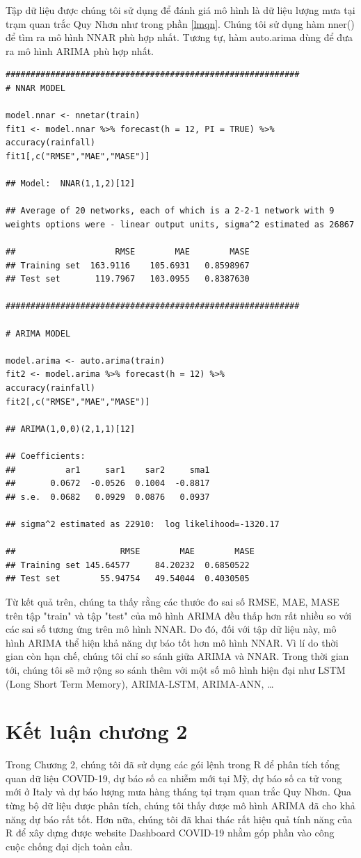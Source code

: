 \documentclass[12pt, a4paper,oneside]{book}
\theoremstyle{definition}
\begin{document}
Tập dữ liệu được chúng tôi sử dụng để đánh giá mô hình là dữ liệu lượng mưa tại trạm quan trắc Quy Nhơn như trong phần \ref{lmqn}. Chúng tôi sử dụng hàm nner() để tìm ra mô hình NNAR phù hợp nhất. Tương tự, hàm auto.arima dùng để đưa ra mô hình ARIMA phù hợp nhất.\\
\begin{lstlisting}
###########################################################
# NNAR MODEL

model.nnar <- nnetar(train)
fit1 <- model.nnar %>% forecast(h = 12, PI = TRUE) %>%
accuracy(rainfall)
fit1[,c("RMSE","MAE","MASE")]

## Model:  NNAR(1,1,2)[12] 

## Average of 20 networks, each of which is a 2-2-1 network with 9 weights options were - linear output units, sigma^2 estimated as 26867

##                    RMSE        MAE        MASE
## Training set  163.9116    105.6931   0.8598967
## Test set       119.7967   103.0955   0.8387630   

###########################################################

# ARIMA MODEL

model.arima <- auto.arima(train)
fit2 <- model.arima %>% forecast(h = 12) %>%
accuracy(rainfall)
fit2[,c("RMSE","MAE","MASE")]

## ARIMA(1,0,0)(2,1,1)[12] 

## Coefficients:
##          ar1     sar1    sar2     sma1
##       0.0672  -0.0526  0.1004  -0.8817
## s.e.  0.0682   0.0929  0.0876   0.0937

## sigma^2 estimated as 22910:  log likelihood=-1320.17

##                     RMSE        MAE        MASE
## Training set 145.64577     84.20232  0.6850522
## Test set        55.94754   49.54044  0.4030505   
\end{lstlisting}
Từ kết quả trên, chúng ta thấy rằng các thước đo sai số RMSE, MAE, MASE trên tập "train" và tập "test" của mô hình ARIMA đều thấp hơn rất nhiều so với các sai số tương ứng trên mô hình NNAR. Do đó, đối với tập dữ liệu này, mô hình ARIMA thể hiện khả năng dự báo tốt hơn mô hình NNAR. Vì lí do thời gian còn hạn chế, chúng tôi chỉ so sánh giữa ARIMA và NNAR. Trong thời gian tới, chúng tôi sẽ mở rộng so sánh thêm với một số mô hình hiện đại như LSTM (Long Short Term Memory), ARIMA-LSTM, ARIMA-ANN, \dots
\section*{Kết luận chương 2}
Trong Chương 2, chúng tôi đã sử dụng các gói lệnh trong R để phân tích tổng quan dữ liệu COVID-19, dự báo số ca nhiễm mới tại Mỹ, dự báo số ca tử vong mới ở Italy và dự báo lượng mưa hàng tháng tại trạm quan trắc Quy Nhơn. Qua từng bộ dữ liệu được phân tích, chúng tôi thấy được mô hình ARIMA đã cho khả năng dự báo rất tốt. Hơn nữa, chúng tôi đã khai thác rất hiệu quả tính năng của R để xây dựng được website Dashboard COVID-19 nhằm góp phần vào công cuộc chống đại dịch toàn cầu.
\end{document}
